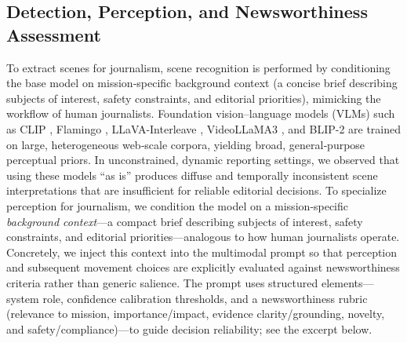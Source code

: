 \documentclass[letterpaper, 10 pt, conference]{ieeeconf}  %
\begin{document}
\subsection{Detection, Perception, and Newsworthiness Assessment}
To extract scenes for journalism, scene recognition is performed by conditioning the base model on mission‑specific background context (a concise brief describing subjects of interest, safety constraints, and editorial priorities), mimicking the workflow of human journalists. Foundation vision–language models (VLMs) such as CLIP \cite{radford2021clip}, Flamingo \cite{alayrac2022flamingo}, LLaVA-Interleave \cite{li2024llava}, VideoLLaMA3 \cite{videollama3_2025}, and BLIP-2 \cite{blip22023} are trained on large, heterogeneous web‑scale corpora, yielding broad, general‑purpose perceptual priors. In unconstrained, dynamic reporting settings, we observed that using these models ``as is'' produces diffuse and temporally inconsistent scene interpretations that are insufficient for reliable editorial decisions. To specialize perception for journalism, we condition the model on a mission‑specific \emph{background context}—a compact brief describing subjects of interest, safety constraints, and editorial priorities—analogous to how human journalists operate. Concretely, we inject this context into the multi\-modal prompt so that perception and subsequent movement choices are explicitly evaluated against newsworthiness criteria rather than generic salience. The prompt uses structured elements—system role, confidence calibration thresholds, and a newsworthiness rubric (relevance to mission, importance/impact, evidence clarity/grounding, novelty, and safety/compliance)—to guide decision reliability; see the excerpt below.

\vspace{-1pt}
\noindent{}
\end{document}
